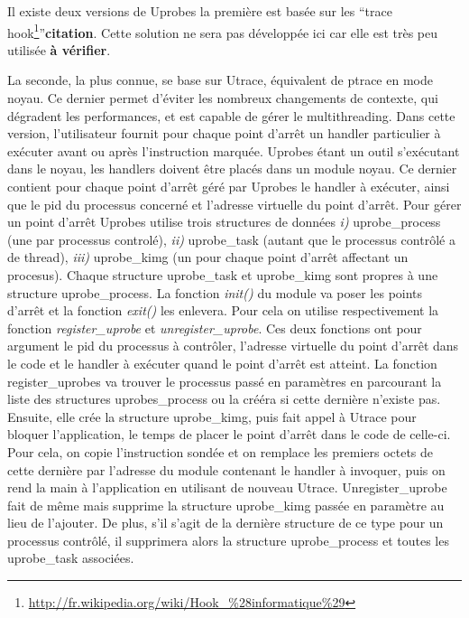 Il existe deux versions de Uprobes la première est basée sur les ``trace
hook\footnote{\url{http://fr.wikipedia.org/wiki/Hook\_\%28informatique\%29}}''\textbf{{\color{red}citation}}. Cette
solution ne sera pas développée ici car elle est très peu utilisée
\textbf{{\color{red} à vérifier}}.

La seconde, la plus connue, se base sur Utrace, équivalent de ptrace en mode
noyau. Ce dernier permet d'éviter les nombreux changements de contexte, qui
dégradent les performances, et est capable de gérer le multithreading. Dans
cette version, l'utilisateur fournit pour chaque point d'arrêt un handler
particulier à exécuter avant ou après l’instruction marquée. Uprobes étant un
outil s'exécutant dans le noyau, les handlers doivent être placés dans un module
noyau. Ce dernier contient pour chaque point d'arrêt géré par Uprobes le handler
à exécuter, ainsi que le pid du processus concerné et l'adresse virtuelle du
point d'arrêt. Pour gérer un point d'arrêt Uprobes utilise trois structures de
données \textit{i)} uprobe\_process (une par processus controlé), \textit{ii)}
uprobe\_task (autant que le processus contrôlé a de thread), \textit{iii)}
uprobe\_kimg (un pour chaque point d'arrêt affectant un procesus). Chaque
structure uprobe\_task et uprobe\_kimg sont propres à une structure
uprobe\_process. La fonction \textit{init()} du module va poser les points
d'arrêt et la fonction \textit{exit()} les enlevera. Pour cela on utilise
respectivement la fonction \textit{register\_uprobe} et
\textit{unregister\_uprobe}. Ces deux fonctions ont pour argument le pid du
processus à contrôler, l'adresse virtuelle du point d'arrêt dans le
code et le handler à exécuter quand le point d'arrêt est atteint. La fonction
register\_uprobes va trouver le processus passé en paramètres en parcourant la
liste des structures uprobes\_process ou la crééra si cette dernière n'existe
pas. Ensuite, elle crée la structure uprobe\_kimg, puis fait appel à Utrace pour
bloquer l'application, le temps de placer le point d'arrêt dans le code de
celle-ci. Pour cela, on copie l'instruction sondée et on remplace les premiers
octets de cette dernière par l'adresse du module contenant le handler à
invoquer, puis on rend la main à l'application en utilisant de nouveau Utrace.
Unregister\_uprobe fait de même mais supprime la structure uprobe\_kimg passée
en paramètre au lieu de l'ajouter. De plus, s'il s'agit de la dernière structure
de ce type pour un processus contrôlé, il supprimera alors la structure
uprobe\_process et toutes les uprobe\_task associées.

